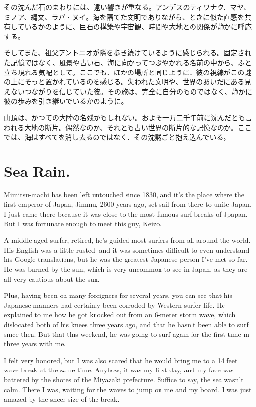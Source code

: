 \documentclass[
  letterpaper,
  oneside]{scrbook}
\begin{document}
その沈んだ石のまわりには、遠い響きが重なる。アンデスのティワナク、マヤ、ミノア、縄文、ラパ・ヌイ。海を隔てた文明でありながら、ときに似た直感を共有しているかのように、巨石の構築や宇宙観、時間や大地との関係が静かに呼応する。

そしてまた、祖父アントニオが隣を歩き続けているように感じられる。固定された記憶ではなく、風景や古い石、海に向かってつぶやかれる名前の中から、ふと立ち現れる気配として。ここでも、ほかの場所と同じように、彼の視線がこの謎の上にそっと置かれているのを感じる。失われた文明や、世界のあいだにある見えないつながりを信じていた彼。その旅は、完全に自分のものではなく、静かに彼の歩みを引き継いでいるかのように。

山頂は、かつての大陸の名残かもしれない。およそ一万二千年前に沈んだとも言われる大地の断片。偶然なのか、それとも古い世界の断片的な記憶なのか。ここでは、海はすべてを消し去るのではなく、その沈黙ごと抱え込んでいる。


\chapter{Sea Rain.}\label{sea-rain.}

Mimitsu-machi has been left untouched since 1830, and it's the place
where the first emperor of Japan, Jimmu, 2600 years ago, set sail from
there to unite Japan. I just came there because it was close to the most
famous surf breaks of Jpapan. But I was fortunate enough to meet this
guy, Keizo.

A middle-aged surfer, retired, he's guided most surfers from all around
the world. His English was a little rusted, and it was sometimes
difficult to even understand his Google translations, but he was the
greatest Japanese person I've met so far. He was burned by the sun,
which is very uncommon to see in Japan, as they are all very cautious
about the sun.

Plus, having been on many foreigners for several years, you can see that
his Japanese manners had certainly been corroded by Western surfer life.
He explained to me how he got knocked out from an 6-meter storm wave,
which dislocated both of his knees three years ago, and that he hasn't
been able to surf since then. But that this weekend, he was going to
surf again for the first time in three years with me.

I felt very honored, but I was also scared that he would bring me to a
14 feet wave break at the same time. Anyhow, it was my first day, and my
face was battered by the shores of the Miyazaki prefecture. Suffice to
say, the sea wasn't calm. There I was, waiting for the waves to jump on
me and my board. I was just amazed by the sheer size of the break.
\end{document}
